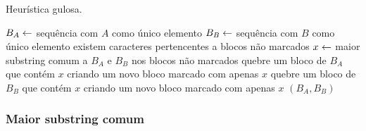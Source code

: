     \begin{algorithm}[htb]
        \caption{Heurística gulosa.} \label{alg:greedy}
        \begin{codebox}
        \li $B_A \leftarrow$ sequência com $A$ como único elemento
        \li $B_B \leftarrow$ sequência com $B$ como único elemento
        \li \Enquanto existem caracteres pertencentes a blocos não marcados \Faca
            \Do
        \li     $x \leftarrow$ maior substring comum a $B_A$ e $B_B$ nos blocos não marcados
        \li     quebre um bloco de $B_A$ que contém $x$ criando um novo bloco marcado com apenas $x$
        \li     quebre um bloco de $B_B$ que contém $x$ criando um novo bloco marcado com apenas $x$
            \End
        \li \Devolva $(B_A, B_B)$
        \end{codebox}
    \end{algorithm}

    \subsubsection{Maior substring comum}

